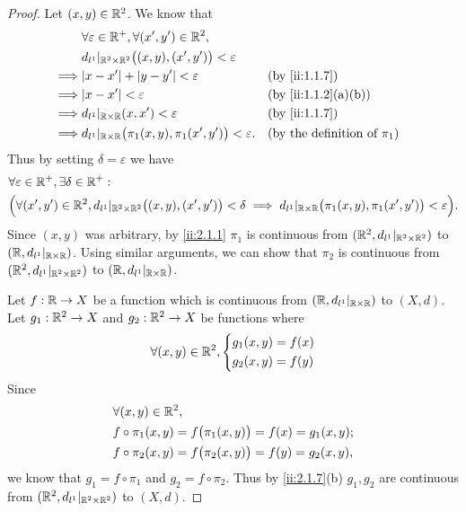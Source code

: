 \begin{proof}
  Let \((x, y) \in \mathbb{R}^2\).
  We know that
  \begin{align*}
             & \forall \varepsilon \in \R^+, \forall (x', y') \in \R^2,                                                                \\
             & d_{l^1}|_{\R^2 \times \R^2}\big((x, y), (x', y')\big) < \varepsilon                                                     \\
    \implies & \abs{x - x'} + \abs{y - y'} < \varepsilon                                  &  & \by{ii:1.1.7}                           \\
    \implies & \abs{x - x'} < \varepsilon                                                 &  & \by{ii:1.1.2}[a,b]                      \\
    \implies & d_{l^1}|_{\R \times \R}(x, x') < \varepsilon                               &  & \by{ii:1.1.7}                           \\
    \implies & d_{l^1}|_{\R \times \R}\big(\pi_1(x, y), \pi_1(x', y')\big) < \varepsilon. &  & \text{(by the definition of \(\pi_1\))}
  \end{align*}
  Thus by setting \(\delta = \varepsilon\) we have
  \begin{align*}
     & \forall \varepsilon \in \mathbb{R}^+, \exists \delta \in \mathbb{R}^+ :                                                                                                                                 \\
     & \Big(\forall (x', y') \in \mathbb{R}^2, d_{l^1}|_{\mathbb{R}^2 \times \mathbb{R}^2}\big((x, y), (x', y')\big) < \delta \implies d_{l^1}|_{\mathbb{R} \times \mathbb{R}}\big(\pi_1(x, y), \pi_1(x', y')\big) < \varepsilon\Big).
  \end{align*}
  Since \((x, y)\) was arbitrary, by \cref{ii:2.1.1} \(\pi_1\) is continuous from \((\mathbb{R}^2, d_{l^1}|_{\mathbb{R}^2 \times \mathbb{R}^2})\) to \((\mathbb{R}, d_{l^1}|_{\mathbb{R} \times \mathbb{R}})\).
  Using similar arguments, we can show that \(\pi_2\) is continuous from \((\mathbb{R}^2, d_{l^1}|_{\mathbb{R}^2 \times \mathbb{R}^2})\) to \((\mathbb{R}, d_{l^1}|_{\mathbb{R} \times \mathbb{R}})\).

  Let \(f : \mathbb{R} \to X\) be a function which is continuous from \((\mathbb{R}, d_{l^1}|_{\mathbb{R} \times \mathbb{R}})\) to \((X, d)\).
  Let \(g_1 : \mathbb{R}^2 \to X\) and \(g_2 : \mathbb{R}^2 \to X\) be functions where
  \[
    \forall (x, y) \in \mathbb{R}^2, \begin{dcases}
      g_1(x, y) = f(x) \\
      g_2(x, y) = f(y)
    \end{dcases}
  \]
  Since
  \begin{align*}
     & \forall (x, y) \in \mathbb{R}^2,                                         \\
     & f \circ \pi_1(x, y) = f\big(\pi_1(x, y)\big) = f(x) = g_1(x, y); \\
     & f \circ \pi_2(x, y) = f\big(\pi_2(x, y)\big) = f(y) = g_2(x, y),
  \end{align*}
  we know that \(g_1 = f \circ \pi_1\) and \(g_2 = f \circ \pi_2\).
  Thus by \cref{ii:2.1.7}(b) \(g_1, g_2\) are continuous from \((\mathbb{R}^2, d_{l^1}|_{\mathbb{R}^2 \times \mathbb{R}^2})\) to \((X, d)\).
\end{proof}

